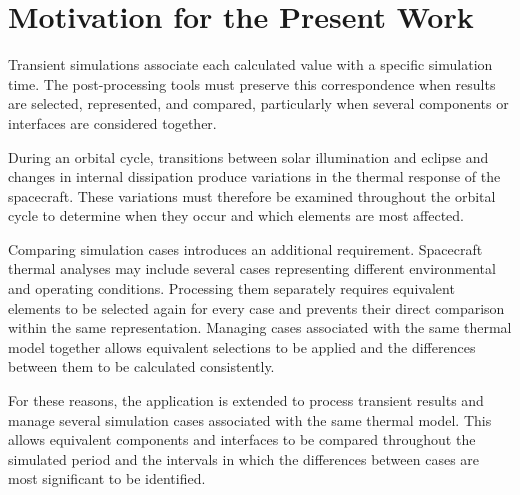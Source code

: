 \section{Motivation for the Present Work}
\label{sec:project_motivation}

Transient simulations associate each calculated value with a specific
simulation time. The post-processing tools must preserve this correspondence
when results are selected, represented, and compared, particularly when
several components or interfaces are considered together.

During an orbital cycle, transitions between solar illumination and eclipse
and changes in internal dissipation produce variations in the thermal response
of the spacecraft. These variations must therefore be examined throughout the 
orbital cycle to determine when they occur and which elements are most affected.

Comparing simulation cases introduces an additional requirement. Spacecraft
thermal analyses may include several cases representing different
environmental and operating conditions. Processing them separately requires
equivalent elements to be selected again for every case and prevents their
direct comparison within the same representation. Managing cases associated
with the same thermal model together allows equivalent selections to be
applied and the differences between them to be calculated consistently.

For these reasons, the application is extended to process transient
results and manage several simulation cases associated with the same thermal
model. This allows equivalent components and interfaces to be compared
throughout the simulated period and the intervals in which the differences
between cases are most significant to be identified.